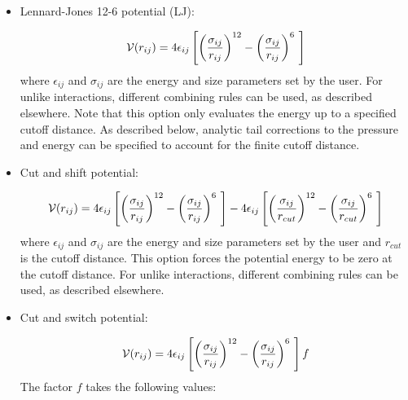 \begin{itemize}

\item Lennard-Jones 12-6 potential (LJ):

\begin{equation}
 {\cal V}(r_{ij})= 4 \epsilon_{ij} \left [  \left ( \frac {\sigma_{ij}} { r_{ij} }\right )^{12} - \left ( \frac {\sigma_{ij}} { r_{ij} }\right )^{6}\ \right ]
\label{eqn:LJ}
\end{equation}
where $\epsilon_{ij}$ and $\sigma_{ij}$ are the energy and size
parameters set by the user. For unlike interactions, different
combining rules can be used, as described elsewhere. Note that this
option only evaluates the energy up to a specified cutoff
distance.  As described below, analytic tail corrections to the pressure and energy can be specified to account for the finite cutoff distance. 



\item Cut and shift potential:

\begin{equation}
{\cal V}(r_{ij})= 4 \epsilon_{ij} \left [  \left ( \frac {\sigma_{ij}} { r_{ij} }\right )^{12} - \left ( \frac {\sigma_{ij}} { r_{ij} }\right )^{6}\ \right ] -  4 \epsilon_{ij} \left [  \left ( \frac {\sigma_{ij}} { r_{cut}}\right )^{12} - \left ( \frac {\sigma_{ij}} { r_{cut} }\right )^{6}\ \right ]
\label{Eq:cut_shift}
\end{equation}
where $\epsilon_{ij}$ and $\sigma_{ij}$ are the energy and size
parameters set by the user and $r_{cut}$ is the cutoff distance. This
option forces the potential energy to be zero at the cutoff
distance. For unlike interactions, different 
combining rules can be used, as described elsewhere.


\item Cut and switch potential:

\begin{equation}
 {\cal V}(r_{ij})= 4 \epsilon_{ij} \left [  \left ( \frac {\sigma_{ij}} { r_{ij} }\right )^{12} - \left ( \frac {\sigma_{ij}} { r_{ij} }\right )^{6}\ \right ] f
 \label{Eq:cut_switch}
\end{equation}
%
The factor $f$ takes the following values:


\end{itemize}
